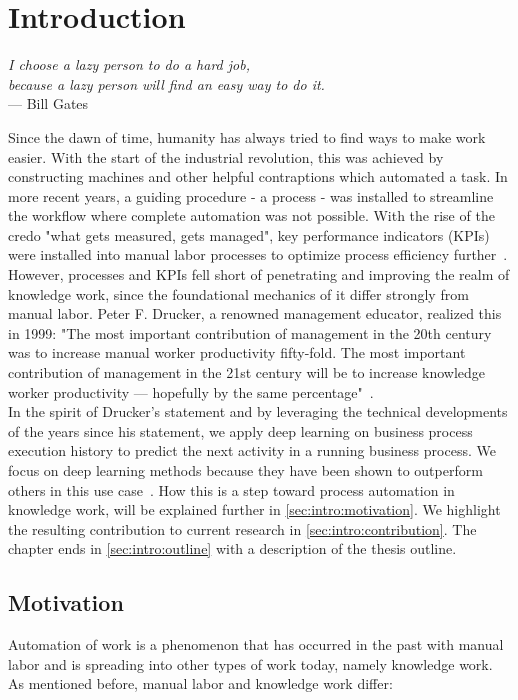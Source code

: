 \chapter{Introduction}\label{sec:intro}
\begin{flushright}{\slshape
I choose a lazy person to do a hard job,\\
because a lazy person will find an easy way to do it.}\\
\medskip
--- Bill Gates
\end{flushright}

\noindent Since the dawn of time, humanity has always tried to find ways to make work easier. With the start of the industrial revolution, this was achieved by constructing machines and other helpful contraptions which automated a task. In more recent years, a guiding procedure - a process - was installed to streamline the workflow where complete automation was not possible. With the rise of the credo "what gets measured, gets managed", key performance indicators (KPIs) were installed into manual labor processes to optimize process efficiency further~\cite{web:taylorism-and-drucker}.\\

However, processes and KPIs fell short of penetrating and improving the realm of knowledge work, since the foundational mechanics of it differ strongly from manual labor. Peter F. Drucker, a renowned management educator, realized this in 1999:
"The most important contribution of management in the 20th century was to increase manual worker productivity fifty-fold. The most important contribution of management in the 21st century will be to increase knowledge worker productivity — hopefully by the same percentage"~\cite{drucker1999}.\\

In the spirit of Drucker's statement and by leveraging the technical developments of the years since his statement, we apply deep learning on business process execution history to predict the next activity in a running business process. We focus on deep learning methods because they have been shown to outperform others in this use case~\cite{tax2018interdisciplinary}. How this is a step toward process automation in knowledge work, will be explained further in \autoref{sec:intro:motivation}.  We highlight the resulting contribution to current research in \autoref{sec:intro:contribution}. The chapter ends in \autoref{sec:intro:outline} with a description of the thesis outline.

\section{Motivation} \label{sec:intro:motivation}
Automation of work is a phenomenon that has occurred in the past with manual labor and is spreading into other types of work today, namely knowledge work. As mentioned before, manual labor and knowledge work differ:

